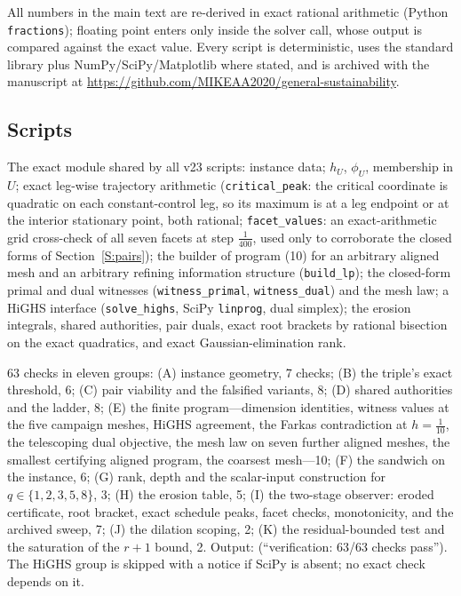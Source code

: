 \documentclass[11pt,a4paper]{article}
\theoremstyle{plain}
\theoremstyle{definition}
\theoremstyle{remark}
\newcommand{\tfr}[2]{\tfrac{#1}{#2}}
\begin{document}
All numbers in the main text are re-derived in exact rational arithmetic (Python \texttt{fractions}); floating point enters only inside the solver call, whose output is compared against the exact value. Every script is deterministic, uses the standard library plus NumPy/SciPy/Matplotlib where stated, and is archived with the manuscript at \url{https://github.com/MIKEAA2020/general-sustainability}.

\subsection{Scripts}

\begin{description}[leftmargin=1.5em,itemsep=2pt]
\item[\texttt{p03\_core.py}] The exact module shared by all v23 scripts: instance data; $h_U$, $\phi_U$, membership in $U$; exact leg-wise trajectory arithmetic (\texttt{critical\_peak}: the critical coordinate is quadratic on each constant-control leg, so its maximum is at a leg endpoint or at the interior stationary point, both rational; \texttt{facet\_values}: an exact-arithmetic grid cross-check of all seven facets at step $\tfr1{400}$, used only to corroborate the closed forms of Section~\ref{S:pairs}); the builder of program (10) for an arbitrary aligned mesh and an arbitrary refining information structure (\texttt{build\_lp}); the closed-form primal and dual witnesses (\texttt{witness\_primal}, \texttt{witness\_dual}) and the mesh law; a HiGHS interface (\texttt{solve\_highs}, SciPy \texttt{linprog}, dual simplex); the erosion integrals, shared authorities, pair duals, exact root brackets by rational bisection on the exact quadratics, and exact Gaussian-elimination rank.
\item[\texttt{paper03\_computational\_certification\_v23\_verification.py}] 63 checks in eleven groups: (A) instance geometry, 7 checks; (B) the triple's exact threshold, 6; (C) pair viability and the falsified variants, 8; (D) shared authorities and the ladder, 8; (E) the finite program---dimension identities, witness values at the five campaign meshes, HiGHS agreement, the Farkas contradiction at $h=\tfr1{10}$, the telescoping dual objective, the mesh law on seven further aligned meshes, the smallest certifying aligned program, the coarsest mesh---10; (F) the sandwich on the instance, 6; (G) rank, depth and the scalar-input construction for $q\in\{1,2,3,5,8\}$, 3; (H) the erosion table, 5; (I) the two-stage observer: eroded certificate, root bracket, exact schedule peaks, facet checks, monotonicity, and the archived sweep, 7; (J) the dilation scoping, 2; (K) the residual-bounded test and the saturation of the $r+1$ bound, 2. Output:  (``verification: 63/63 checks pass''). The HiGHS group is skipped with a notice if SciPy is absent; no exact check depends on it.

\end{description}
\end{document}
